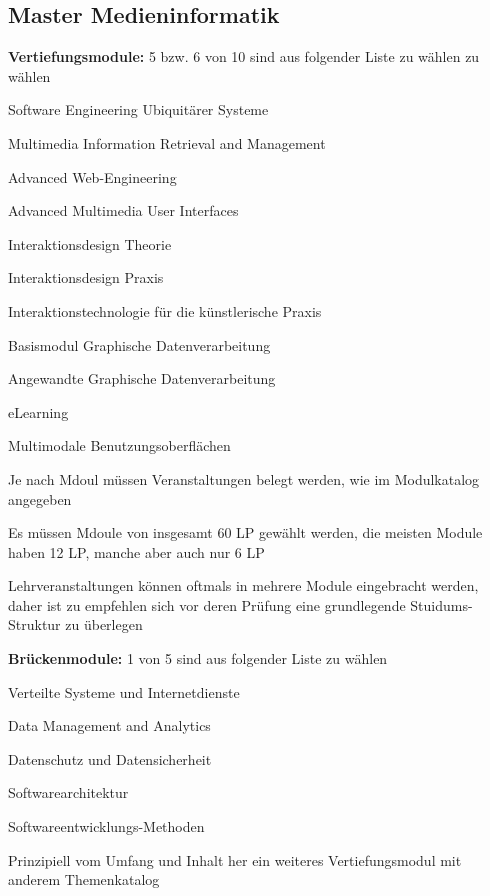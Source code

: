 \documentclass[a4paper,12pt]{report}
\begin{document}
\subsection{Master Medieninformatik}
\begin{itemize*}
	\item \textbf{Vertiefungsmodule:} 5 bzw. 6 von 10 sind aus folgender Liste zu wählen zu wählen
	\begin{itemize*}
		\item Software Engineering Ubiquitärer Systeme
		\item Multimedia Information Retrieval and Management
		\item Advanced Web-Engineering
		\item Advanced Multimedia User Interfaces
		\item Interaktionsdesign Theorie
		\item Interaktionsdesign Praxis
		\item Interaktionstechnologie für die künstlerische Praxis
		\item Basismodul Graphische Datenverarbeitung
		\item Angewandte Graphische Datenverarbeitung
		\item eLearning
		\item Multimodale Benutzungsoberflächen
	\end{itemize*}
	\item Je nach Mdoul müssen Veranstaltungen belegt werden, wie im Modulkatalog angegeben
	\item Es müssen Mdoule von insgesamt 60 LP gewählt werden, die meisten Module haben 12 LP, manche aber auch nur 6 LP
	\item Lehrveranstaltungen können oftmals in mehrere Module eingebracht werden, daher ist zu empfehlen sich vor deren Prüfung eine grundlegende Stuidums-Struktur zu überlegen
	\item \textbf{Brückenmodule:} 1 von 5 sind aus folgender Liste zu wählen
	\begin{itemize*}
		\item Verteilte Systeme und Internetdienste
		\item Data Management and Analytics
		\item Datenschutz und Datensicherheit
		\item Softwarearchitektur
		\item Softwareentwicklungs-Methoden
	\end{itemize*}
	\item Prinzipiell vom Umfang und Inhalt her ein weiteres Vertiefungsmodul mit anderem Themenkatalog

\end{itemize*}
\end{document}
